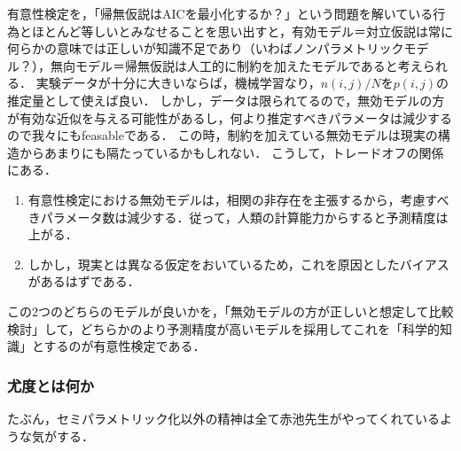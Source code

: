\documentclass[uplatex,dvipdfmx]{jsreport}
\begin{document}
\begin{discussion}[最小AIC推定の哲学から見た有意性検定]
    有意性検定を，「帰無仮説はAICを最小化するか？」という問題を解いている行為とほとんど等しいとみなせることを思い出すと，有効モデル＝対立仮説は常に何らかの意味では正しいが知識不足であり（いわばノンパラメトリックモデル？），無向モデル＝帰無仮説は人工的に制約を加えたモデルであると考えられる．
    実験データが十分に大きいならば，機械学習なり，$n(i,j)/N$を$p(i,j)$の推定量として使えば良い．
    しかし，データは限られてるので，無効モデルの方が有効な近似を与える可能性があるし，何より推定すべきパラメータは減少するので我々にもfeasableである．
    この時，制約を加えている無効モデルは現実の構造からあまりにも隔たっているかもしれない．
    こうして，トレードオフの関係にある．
    \begin{enumerate}
        \item 有意性検定における無効モデルは，相関の非存在を主張するから，考慮すべきパラメータ数は減少する．従って，人類の計算能力からすると予測精度は上がる．
        \item しかし，現実とは異なる仮定をおいているため，これを原因としたバイアスがあるはずである．
    \end{enumerate}
    この2つのどちらのモデルが良いかを，「無効モデルの方が正しいと想定して比較検討」して，どちらかのより予測精度が高いモデルを採用してこれを「科学的知識」とするのが有意性検定である．
\end{discussion}

\subsubsection{尤度とは何か}

\begin{tcolorbox}[colframe=ForestGreen, colback=ForestGreen!10!white,breakable,colbacktitle=ForestGreen!40!white,coltitle=black,fonttitle=\bfseries\sffamily,
title=]
    たぶん，セミパラメトリック化以外の精神は全て赤池先生がやってくれているような気がする．
\end{tcolorbox}
\end{document}
